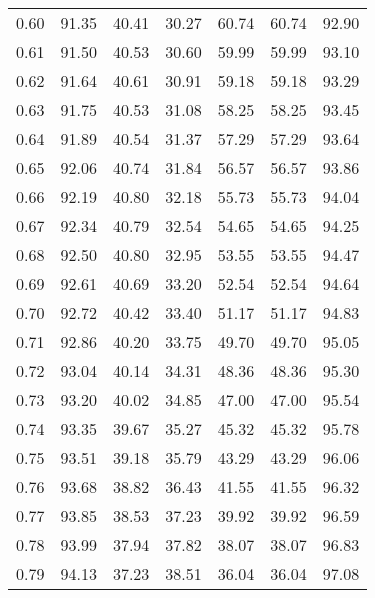 \begin{tabular}{|c|c|c|c|c|c|c|}
      0.60 &     91.35 &     40.41 &      30.27 &   60.74 &      60.74 &         92.90 \\
      0.61 &     91.50 &     40.53 &      30.60 &   59.99 &      59.99 &         93.10 \\
      0.62 &     91.64 &     40.61 &      30.91 &   59.18 &      59.18 &         93.29 \\
      0.63 &     91.75 &     40.53 &      31.08 &   58.25 &      58.25 &         93.45 \\
      0.64 &     91.89 &     40.54 &      31.37 &   57.29 &      57.29 &         93.64 \\
      0.65 &     92.06 &     40.74 &      31.84 &   56.57 &      56.57 &         93.86 \\
      0.66 &     92.19 &     40.80 &      32.18 &   55.73 &      55.73 &         94.04 \\
      0.67 &     92.34 &     40.79 &      32.54 &   54.65 &      54.65 &         94.25 \\
      0.68 &     92.50 &     40.80 &      32.95 &   53.55 &      53.55 &         94.47 \\
      0.69 &     92.61 &     40.69 &      33.20 &   52.54 &      52.54 &         94.64 \\
      0.70 &     92.72 &     40.42 &      33.40 &   51.17 &      51.17 &         94.83 \\
      0.71 &     92.86 &     40.20 &      33.75 &   49.70 &      49.70 &         95.05 \\
      0.72 &     93.04 &     40.14 &      34.31 &   48.36 &      48.36 &         95.30 \\
      0.73 &     93.20 &     40.02 &      34.85 &   47.00 &      47.00 &         95.54 \\
      0.74 &     93.35 &     39.67 &      35.27 &   45.32 &      45.32 &         95.78 \\
      0.75 &     93.51 &     39.18 &      35.79 &   43.29 &      43.29 &         96.06 \\
      0.76 &     93.68 &     38.82 &      36.43 &   41.55 &      41.55 &         96.32 \\
      0.77 &     93.85 &     38.53 &      37.23 &   39.92 &      39.92 &         96.59 \\
      0.78 &     93.99 &     37.94 &      37.82 &   38.07 &      38.07 &         96.83 \\
      0.79 &     94.13 &     37.23 &      38.51 &   36.04 &      36.04 &         97.08 \\

\end{tabular}
